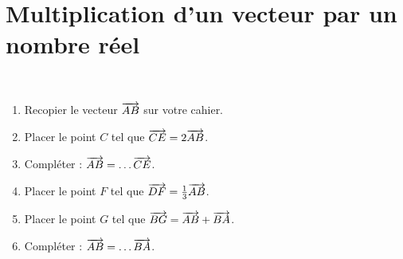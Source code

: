 \documentclass[12pt, aspectratio=43]{beamer}
\begin{document}
\setcounter{section}{1}
\section{Multiplication d'un vecteur par un nombre réel}

\begin{frame}~

  \begin{center}
\end{center}

\begin{enumerate}
  \item Recopier le vecteur $\overrightarrow{AB}$ sur votre cahier.
  \item Placer le point $C$ tel que $\overrightarrow{CE}=2\overrightarrow{AB}$.
  \item Compléter : $\overrightarrow{AB}=\ldots\overrightarrow{CE}$.
  \item Placer le point $F$ tel que $\overrightarrow{DF}=\frac{1}{3}\overrightarrow{AB}$.
  \item Placer le point $G$ tel que $\overrightarrow{BG}=\overrightarrow{AB}+\overrightarrow{BA}$.
  \item Compléter : $\overrightarrow{AB}=\ldots\overrightarrow{BA}$.
\end{enumerate}
\end{frame}
\end{document}
